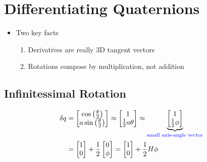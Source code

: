 \documentclass[11pt]{article}
\begin{document}
\section{Differentiating Quaternions}

\begin{itemize}
    \item Two key facts
    \begin{enumerate}
        \item Derivatives are really 3D tangent vectors
        \item Rotations compose by multiplication, not addition
    \end{enumerate}
\end{itemize}
\subsection{Infinitessimal Rotation}
\begin{align*}
    \delta q &= \begin{bmatrix}
        \cos\left( \frac{\theta}{2}\right) \\
        a\sin\left(\frac{\theta}{2}\right)
    \end{bmatrix}
    \approx 
    \begin{bmatrix}
        1 \\
        \frac{1}{2}a\theta
    \end{bmatrix}
    \approx
    \underbrace{
    \begin{bmatrix}
        1 \\
        \frac{1}{2}\phi
    \end{bmatrix}
    }_{\textcolor{blue}{\text{small axis-angle vector}}}
    \\
    &= \begin{bmatrix}
        1 \\
        0
    \end{bmatrix}
    +
    \frac{1}{2}
    \begin{bmatrix}
        0 \\
        \phi
    \end{bmatrix}
    =
    \begin{bmatrix}
        1 \\
        0
    \end{bmatrix}
    + \frac{1}{2}H\phi
\end{align*}
\end{document}
